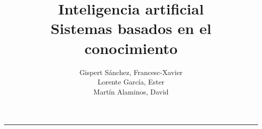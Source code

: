 \documentclass[a4paper,12pt,spanish]{article}
\begin{document}
\title{
    Inteligencia artificial\\ 
    Sistemas basados en el conocimiento
}

\author{
    Gispert Sánchez, Francesc-Xavier\\
    Lorente García, Ester\\
    Martín Alaminos, David
}

\maketitle

\noindent \rule[0.5ex]{1\columnwidth}{1pt}

\tableofcontents

\clearpage












\end{document}
